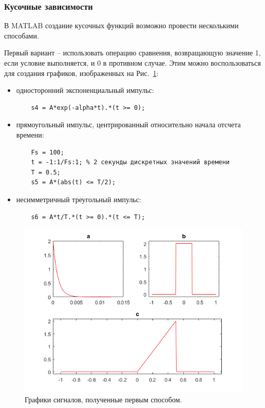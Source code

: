 \documentclass[12pt,a4paper]{article}
\begin{document}
\subsubsection{Кусочные зависимости}
В MATLAB создание кусочных функций возможно провести несколькими способами.

Первый вариант -- использовать операцию сравнения, возвращающую значение 1, если условие выполняется, и 0 в противном случае. Этим можно воспользоваться для создания графиков, изображенных на Рис.~\ref{fig:img4}:
\begin{itemize}
  \item односторонний экспоненциальный импульс:
    \begin{verbatim}
    s4 = A*exp(-alpha*t).*(t >= 0);
    \end{verbatim}
  \item прямоугольный импульс, центрированный относительно начала отсчета времени:
    \begin{verbatim}
    Fs = 100;
    t = -1:1/Fs:1; % 2 секунды дискретных значений времени
    T = 0.5;
    s5 = A*(abs(t) <= T/2);
    \end{verbatim}
  \item несимметричный треугольный импульс:
    \begin{verbatim}
    s6 = A*t/T.*(t >= 0).*(t <= T);
    \end{verbatim}
\end{itemize}
\begin{figure}[!ht]
  \centering
  \includegraphics[width=\linewidth]{img4}
  \caption{Графики сигналов, полученные первым способом.}
  \label{fig:img4}
\end{figure}
\end{document}
